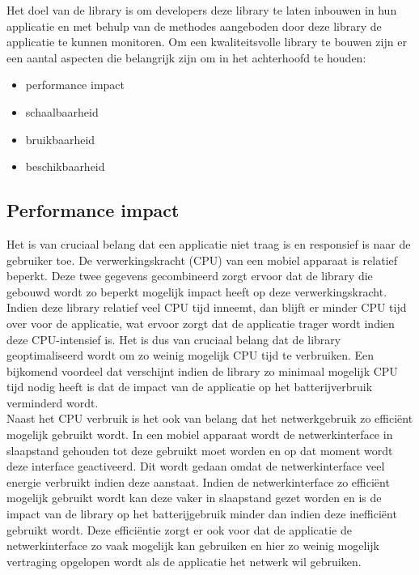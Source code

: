 \noindent Het doel van de library is om developers deze library te laten inbouwen in hun applicatie en met behulp van de methodes aangeboden door deze library de applicatie te kunnen monitoren. Om een kwaliteitsvolle library te bouwen zijn er een aantal aspecten die belangrijk zijn om in het achterhoofd te houden:
\begin{itemize}
\item performance impact
\item schaalbaarheid
\item bruikbaarheid
\item beschikbaarheid
\end{itemize}

\subsection{Performance impact}
Het is van cruciaal belang dat een applicatie niet traag is en responsief is naar de gebruiker toe. De verwerkingskracht (CPU) van een mobiel apparaat is relatief beperkt. Deze twee gegevens gecombineerd zorgt ervoor dat de library die gebouwd wordt zo beperkt mogelijk impact heeft op deze verwerkingskracht. Indien deze library relatief veel CPU tijd inneemt, dan blijft er minder CPU tijd over voor de applicatie, wat ervoor zorgt dat de applicatie trager wordt indien deze CPU-intensief is. Het is dus van cruciaal belang dat de library geoptimaliseerd wordt om zo weinig mogelijk CPU tijd te verbruiken. Een bijkomend voordeel dat verschijnt indien de library zo minimaal mogelijk CPU tijd nodig heeft is dat de impact van de applicatie op het batterijverbruik verminderd wordt.  \\

\noindent Naast het CPU verbruik is het ook van belang dat het netwerkgebruik zo effici\"ent mogelijk gebruikt wordt. In een mobiel apparaat wordt de netwerkinterface in slaapstand gehouden tot deze gebruikt moet worden en op dat moment wordt deze interface geactiveerd. Dit wordt gedaan omdat de netwerkinterface veel energie verbruikt indien deze aanstaat. Indien de netwerkinterface zo effici\"ent mogelijk gebruikt wordt kan deze vaker in slaapstand gezet worden en is de impact van de library op het batterijgebruik minder dan indien deze ineffici\"ent gebruikt wordt. Deze effici\"entie zorgt er ook voor dat de applicatie de netwerkinterface zo vaak mogelijk kan gebruiken en hier zo weinig mogelijk vertraging opgelopen wordt als de applicatie het netwerk wil gebruiken. \\

